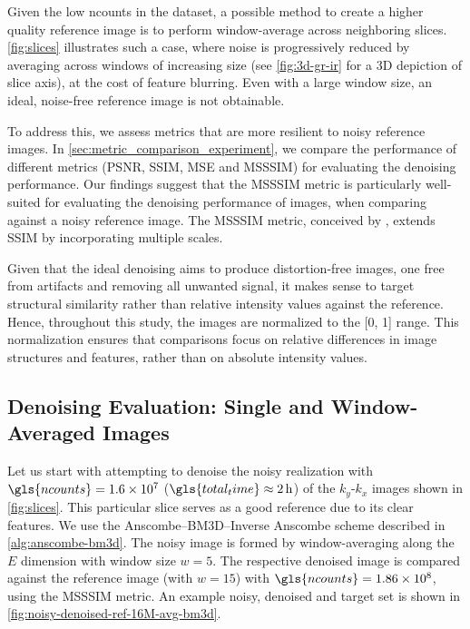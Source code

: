 Given the low \gls{ncounts} in the dataset, a possible method to create a higher quality reference image is to perform window-average across neighboring slices. \cref{fig:slices} illustrates such a case, where noise is progressively reduced by averaging across windows of increasing size (see \cref{fig:3d-gr-ir} for a 3D depiction of slice axis), at the cost of feature blurring. Even with a large window size, an ideal, noise-free reference image is not obtainable.

To address this, we assess metrics that are more resilient to noisy reference images. In \cref{sec:metric_comparison_experiment}, we compare the performance of different metrics (\gls{PSNR}, \gls{SSIM}, \gls{MSE} and \gls{MSSSIM}) for evaluating the denoising performance. Our findings suggest that the \gls{MSSSIM} metric is particularly well-suited for evaluating the denoising performance of images, when comparing against a noisy reference image. The \gls{MSSSIM} metric, conceived by \citeauthor{wangMultiscaleStructuralSimilarity2003} \cite{wangMultiscaleStructuralSimilarity2003}, extends SSIM by incorporating multiple scales. 

Given that the ideal denoising aims to produce distortion-free images, one free from artifacts and removing all unwanted signal, it makes sense to target structural similarity rather than relative intensity values against the reference. Hence, throughout this study, the images are normalized to the [\num{0}, \num{1}] range. This normalization ensures that comparisons focus on relative differences in image structures and features, rather than on absolute intensity values.

\subsection{Denoising Evaluation: Single and Window-Averaged Images}
Let us start with attempting to denoise the noisy realization with $\gls{ncounts}=\num{1.6e7}$ ($\gls{total_time}\approx\qty{2}{h}$) of the $k_y$-$k_x$ images shown in \cref{fig:slices}. This particular slice serves as a good reference due to its clear features. We use the Anscombe--\gls{BM3D}--Inverse Anscombe scheme described in \cref{alg:anscombe-bm3d}. The noisy image is formed by window-averaging along the $E$ dimension with window size $w = 5$. The respective denoised image is compared against the reference image (with $w=15$) with $\gls{ncounts}=\num{1.86e8}$, using the \gls{MSSSIM} metric. An example noisy, denoised and target set is shown in \cref{fig:noisy-denoised-ref-16M-avg-bm3d}. 

